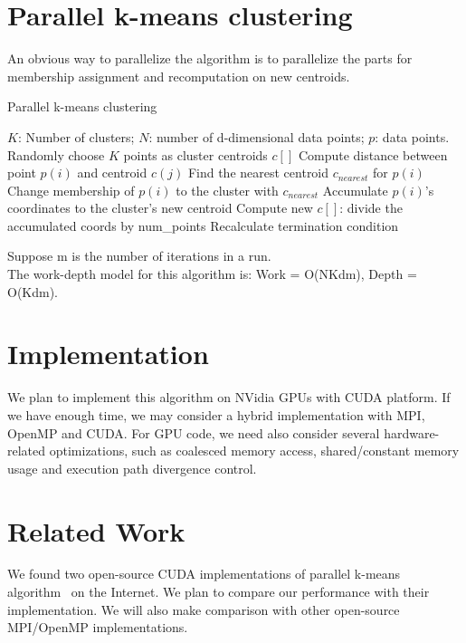 \documentclass{article}
\begin{document}
\section{Parallel k-means clustering}
An obvious way to parallelize the algorithm is to parallelize the
parts for membership assignment and recomputation on new centroids.
\begin{algorithm}
  \caption{Parallel k-means clustering} \label{par}
  \begin{algorithmic}[1]
    \INPUT $K$: Number of clusters; $N$: number of d-dimensional data points; $p$: data points.
     \label{alg:p}
    \State Randomly choose $K$ points as cluster centroids $c[]$
    \State Compute distance between point $p(i)$ and centroid $c(j)$
    \EndFor
    \State Find the nearest centroid $c_{nearest}$ for $p(i)$
    \State Change membership of $p(i)$ to the cluster with $c_{nearest}$
    \State Accumulate $p(i)$'s coordinates to the cluster's new centroid
    \EndParFor
    \State Compute new $c[]$: divide the accumulated coords by num\_points
    \State Recalculate termination condition
    \EndWhile
    \EndFunction  
  \end{algorithmic}
\end{algorithm}

\vspace{5mm}
\noindent
Suppose m is the number of iterations in a run. \\
The work-depth model for this algorithm is: Work = O(NKdm), Depth = O(Kdm).

\section{Implementation}
We plan to implement this algorithm on NVidia GPUs with CUDA platform. If we have
enough time, we may consider a hybrid implementation with MPI, OpenMP
and CUDA. For GPU code, we need also consider several
hardware-related optimizations, such as coalesced memory
access, shared/constant memory usage and execution path divergence control.

\section{Related Work}
We found two open-source CUDA implementations of parallel k-means
algorithm~\cite{serban-kmeans, gpuminer} on the Internet. We plan to compare
our performance with their implementation. We will also make comparison with 
other open-source MPI/OpenMP implementations.
\end{document}
